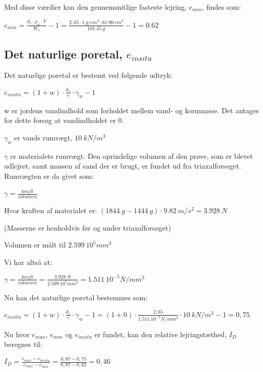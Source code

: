 Med disse værdier kan den gennemsnitlige fasteste lejring, $e_{min}$, findes som:

$e_{min}=\frac{d_{s}\cdot \rho_{w}\cdot V}{W_{s}}-1=\frac{2,65\cdot \SI{1}{g/cm^{3}} \cdot \SI{61,90}{cm^{3}}}{\SI{101,45}{g}}-1=0.62$

\subsection{Det naturlige poretal, $e_{in situ}$}

Det naturlige poretal er bestemt ved følgende udtryk:

$e_{in situ}=(1+w)\cdot\frac{d_{s}}{\gamma}\cdot \gamma_{w}-1$

w er jordens vandindhold som forholdet mellem vand- og kornmasse. Det antages for dette forsøg at vandindholdet er 0.

$\gamma_{w}$ er vands rumvægt, $\SI{10}{kN/m^{3}}$ 

$\gamma$ er materialets rumvægt. Den oprindelige volumen af den prøve, som er blevet udlejret, samt massen af sand der er brugt, er fundet ud fra triaxalforsøget. Rumvægten er da givet som:

$\gamma=\frac{kraft}{volumen}$.

Hvor kraften af materialet er:
$(\SI{1844}{g}-\SI{1444}{g})\cdot \SI{9,82}{m/s^{2}}=\SI{3,928}{N}$

(Masserne er henholdvis før og under triaxalforsøget)

Volumen er målt til $\SI{2,599}{10^{5}mm^{3}}$

Vi har altså at:

$\gamma=\frac{kraft}{volumen}=\frac{\SI{3,928}{N}}{\SI{2,599}{10^{5}mm^{3}}}=\SI{1.511}{10^{-5}N/mm^{3}}$

Nu kan det naturlige poretal bestemmes som:

$e_{in situ}=(1+w)\cdot\frac{d_{s}}{\gamma}\cdot \gamma_{w}-1=(1+0)\cdot\frac{2,65}{\SI{1.511}{10^{-5}N/mm^{3}}}\cdot \SI{10}{kN/m^{3}}-1=0,75$

Nu hvor $e_{max}$, $e_{min}$ og $e_{in situ}$ er fundet, kan den relative lejringstæthed, $I_{D}$ beregnes til:

$I_{D}=\frac{e_{max}-e_{in situ}}{e_{max}-e_{min}}=\frac{0,87-0,75}{0,87-0,62}=0,46$

